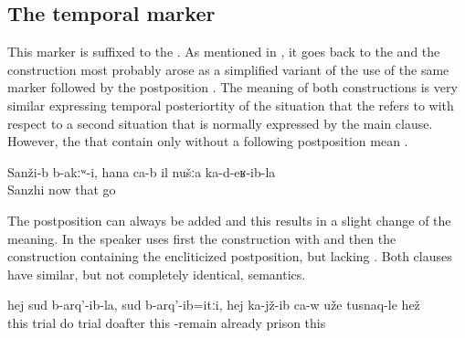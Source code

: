 
\subsection{The temporal marker  }
\label{sec:temporal marker -la}

This marker is suffixed to the . As mentioned in , it goes back to the  and the construction most probably arose as a simplified variant of the use of the same marker followed by the postposition . The meaning of both constructions is very similar expressing temporal posteriortity of the situation that the  refers to with respect to a second situation that is normally expressed by the main clause. However, the  that contain only  without a following postposition mean .
%
\begin{exe}
	\ex	\label{ex:‎In Sanzhi there was no (such plant), now there is, since we moved here}
	\gll	Sanži-b	b-akːʷ-i,	hana	ca-b	il	nušːa	ka-d-eʁ-ib-la\\
		Sanzhi		now		that		go\\
	\glt	{}
\end{exe}

The postposition can always be added and this results in a slight change of the meaning. In  the speaker uses first the construction with  and then the construction containing the encliticized postposition, but lacking . Both clauses have similar, but not completely identical, semantics. 
%
\begin{exe}
	\ex	\label{ex:Since the trial, after the trial was made, he is already sitting in prison}
	\gll	hej	sud	b-arq'-ib-la,	sud	b-arq'-ib=itːi,	hej	ka-jž-ib	ca-w	uže	tusnaq-le	hež\\
		this	trial	do	trial	doafter	this	-remain		already	prison	this\\
	\glt	{}
\end{exe}


